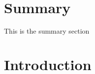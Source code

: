 \documentclass[11pt]{article}
\begin{document}
\section*{Summary}
This is the summary section
\cleardoublepage

\tableofcontents
\thispagestyle{empty}
\cleardoublepage
\setcounter{page}{1}

\section{Introduction}
\lipsum[1]
\end{document}
